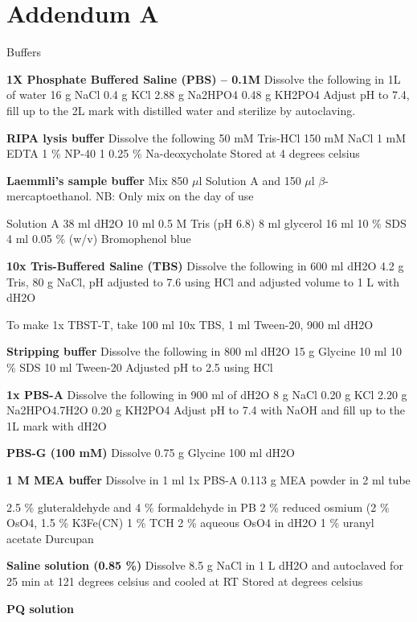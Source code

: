 \chapter*{Addendum A}\label{addendum}

Buffers

\textbf{1X Phosphate Buffered Saline (PBS) – 0.1M}
Dissolve the following in 1L of water 
16 g NaCl 
0.4 g KCl 
2.88 g Na2HPO4 
0.48 g KH2PO4 
Adjust pH to 7.4, fill up to the 2L mark with distilled water and sterilize by autoclaving.

\textbf{RIPA lysis buffer}
Dissolve the following
50 mM Tris-HCl
150 mM NaCl 
1 mM EDTA 
1 \% NP-40 1
0.25 \% Na-deoxycholate 
Stored at 4 degrees celsius

\textbf{Laemmli’s sample buffer}
Mix 850 $\mu$l Solution A and 150 $\mu$l $\beta$-mercaptoethanol. NB: Only mix on the day of use

Solution A 
38 ml dH2O
10 ml 0.5 M Tris (pH 6.8)
8 ml glycerol
16 ml 10 \% SDS
4 ml 0.05 \% (w/v) Bromophenol blue

\textbf{10x Tris-Buffered Saline (TBS)}
Dissolve the following in 600 ml dH2O
4.2 g Tris, 
80 g NaCl,   
pH adjusted to 7.6 using HCl and adjusted  volume to 1 L with dH2O

To make  1x TBST-T, take
100 ml 10x TBS, 
1 ml Tween-20, 
900 ml dH2O

\textbf{Stripping buffer}
Dissolve the following in 800 ml dH2O
15 g Glycine
 10 ml 10 \% SDS 
 10 ml Tween-20
 Adjusted pH  to 2.5 using HCl
 
 \textbf{1x PBS-A}
Dissolve the following in 900 ml of dH2O 
8 g NaCl 
0.20 g KCl 
2.20 g Na2HPO4.7H2O
0.20 g KH2PO4 
Adjust pH to 7.4 with NaOH and fill up to the 1L mark with dH2O

\textbf{PBS-G (100 mM)}
Dissolve
0.75 g Glycine 
100 ml dH2O

\textbf{1 M MEA buffer}
Dissolve in 1 ml 1x PBS-A
0.113 g MEA powder in 2 ml tube

2.5 \% gluteraldehyde and 4 \% formaldehyde in PB
2 \% reduced osmium (2 \% OsO4, 1.5 \% K3Fe(CN)
1 \% TCH
2 \% aqueous OsO4 in dH2O
1 \% uranyl acetate
Durcupan

\textbf{Saline solution (0.85 \%)}
Dissolve 8.5 g NaCl in 1 L dH2O and autoclaved for 25 min at 121 degrees celsius and cooled at RT
Stored at degrees celsius 

\textbf {PQ solution} 

